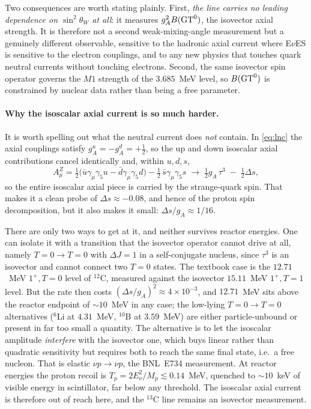 \documentclass[aps,prd,superscriptaddress,nofootinbib,longbibliography,notitlepage,11pt]{revtex4-2}
\newcommand{\eves}{E$\nu$ES}
\newcommand{\sw}{\sin^2\theta_W}
\begin{document}
Two consequences are worth stating plainly.  First, \emph{the line carries no leading
dependence on $\sw$ at all}: it measures $g_A^2 B({\rm GT}^0)$, the isovector axial
strength.  It is therefore not a second weak-mixing-angle measurement but a genuinely
different observable, sensitive to the hadronic axial current where \eves{} is sensitive to
the electron couplings, and to any new physics that touches quark neutral currents without
touching electrons.  Second, the same isovector spin operator governs the $M1$ strength of
the $3.685$~MeV level, so $B({\rm GT}^0)$ is constrained by nuclear data rather than being a
free parameter.

\paragraph{Why the isoscalar axial current is so much harder.}
It is worth spelling out what the neutral current does \emph{not} contain.  In
\cref{eq:lnc} the axial couplings satisfy $g_A^u=-g_A^d=+\tfrac12$, so the up and down
isoscalar axial contributions cancel identically and, within $u,d,s$,
\begin{equation}
A_\mu^{Z}=\tfrac12\big(\bar u\gamma_\mu\gamma_5u-\bar d\gamma_\mu\gamma_5 d\big)
-\tfrac12\,\bar s\gamma_\mu\gamma_5 s
\;\longrightarrow\;
\tfrac12 g_A\,\tau^3\;-\;\tfrac12\Delta s ,
\label{eq:isoscalar}
\end{equation}
so the entire isoscalar axial piece is carried by the strange-quark spin.  That makes it a
clean probe of $\Delta s\approx-0.08$, and hence of the proton spin decomposition, but it
also makes it small: $\Delta s/g_A\approx1/16$.

There are only two ways to get at it, and neither survives reactor energies.  One can
isolate it with a transition that the isovector operator cannot drive at all, namely
$T=0\to T=0$ with $\Delta J=1$ in a self-conjugate nucleus, since $\tau^3$ is an isovector
and cannot connect two $T=0$ states.  The textbook case is the $12.71$~MeV $1^+,T=0$ level
of $^{12}$C, measured against the isovector $15.11$~MeV $1^+,T=1$ level.  But the rate then
costs $(\Delta s/g_A)^2\approx4\times10^{-3}$, and $12.71$~MeV sits above the reactor
endpoint of $\sim10$~MeV in any case; the low-lying $T=0\to T=0$ alternatives
($^{6}$Li at $4.31$~MeV, $^{10}$B at $3.59$~MeV) are either particle-unbound or present in
far too small a quantity.  The alternative is to let the isoscalar amplitude
\emph{interfere} with the isovector one, which buys linear rather than quadratic
sensitivity but requires both to reach the same final state, i.e.\ a free nucleon.  That is
elastic $\nu p\to\nu p$, the BNL~E734 measurement.  At reactor energies the proton recoil is
$T_p=2E_\nu^2/M_p\lesssim0.14$~MeV, quenched to $\sim10$~keV of visible energy in
scintillator, far below any threshold.  The isoscalar axial current is therefore out of
reach here, and the $^{13}$C line remains an isovector measurement.
\end{document}
